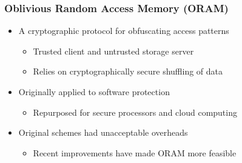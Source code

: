 \documentclass{beamer}
\begin{document}
\begin{frame}
    \frametitle{Oblivious Random Access Memory (ORAM)}
    \begin{itemize}
        \item A cryptographic protocol for obfuscating access patterns
            \begin{itemize}
                \item Trusted client and untrusted storage server
                \item Relies on cryptographically secure shuffling of data
            \end{itemize}
        \item Originally applied to software protection
            \begin{itemize}
                \item Repurposed for secure processors and cloud computing
            \end{itemize}
        \item Original schemes had unacceptable overheads
            \begin{itemize}
                \item Recent improvements have made ORAM more feasible
            \end{itemize}
    \end{itemize}
\end{frame}
\end{document}
